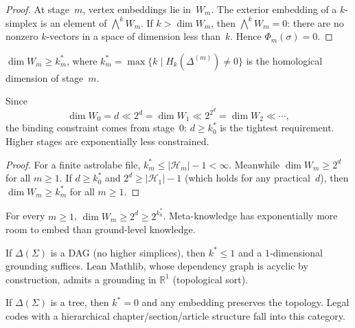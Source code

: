 \begin{proof}
At stage~$m$, vertex embeddings lie in~$W_m$. The exterior embedding of a $k$-simplex is an element of $\bigwedge^k W_m$. If $k > \dim W_m$, then $\bigwedge^k W_m = 0$: there are no nonzero $k$-vectors in a space of dimension less than~$k$. Hence $\Phi_m(\sigma) = 0$.
\end{proof}

\begin{corollary}
$\dim W_m \geq k_m^*$, where $k_m^* = \max\{k \mid H_k(\Delta^{(m)}) \neq 0\}$ is the homological dimension of stage~$m$.
\end{corollary}

\begin{theorem}\label{thm:binding}
Since
\[
  \dim W_0 = d \ll 2^d = \dim W_1 \ll 2^{2^d} = \dim W_2 \ll \cdots,
\]
the binding constraint comes from stage~0: $d \geq k_0^*$ is the tightest requirement. Higher stages are exponentially less constrained.
\end{theorem}

\begin{proof}
For a finite astrolabe file, $k_m^* \leq |\mathcal{H}_m| - 1 < \infty$. Meanwhile $\dim W_m \geq 2^d$ for all $m \geq 1$. If $d \geq k_0^*$ and $2^d \geq |\mathcal{H}_1| - 1$ (which holds for any practical~$d$), then $\dim W_m \geq k_m^*$ for all $m \geq 1$.
\end{proof}

\begin{theorem}
For every $m \geq 1$, $\dim W_m \geq 2^d \geq 2^{k_0^*}$. Meta-knowledge has exponentially more room to embed than ground-level knowledge.
\end{theorem}

\begin{corollary}[DAG]
If $\Delta(\Sigma)$ is a DAG (no higher simplices), then $k^* \leq 1$ and a $1$-dimensional grounding suffices. Lean Mathlib, whose dependency graph is acyclic by construction, admits a grounding in $\mathbb{R}^1$ (topological sort).
\end{corollary}

\begin{corollary}[Tree]
If $\Delta(\Sigma)$ is a tree, then $k^* = 0$ and any embedding preserves the topology. Legal codes with a hierarchical chapter/section/article structure fall into this category.
\end{corollary}

